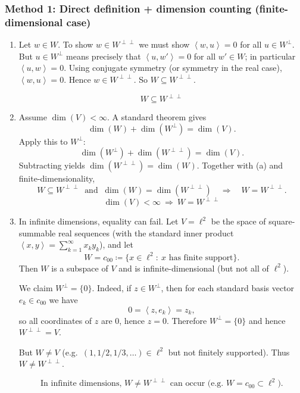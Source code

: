 \documentclass[12pt]{article}
\newcommand{\df}{\coloneqq}
\newcommand{\ip}[2]{\left\langle #1,#2\right\rangle}
\begin{document}
\subsubsection{Method 1: Direct definition + dimension counting (finite-dimensional case)}
\begin{enumerate}[label=(\alph*)]
\item Let $w\in W$. To show $w\in W^{\perp\perp}$ we must show $\ip{w}{u}=0$ for all $u\in W^\perp$.
But $u\in W^\perp$ means precisely that $\ip{u}{w'}=0$ for all $w'\in W$; in particular $\ip{u}{w}=0$.
Using conjugate symmetry (or symmetry in the real case), $\ip{w}{u}=0$. Hence $w\in W^{\perp\perp}$.
So $W\subseteq W^{\perp\perp}$.

\[
\boxed{\,W\subseteq W^{\perp\perp}\,}
\]

\item Assume $\dim(V)<\infty$. A standard theorem gives
\[
\dim(W)+\dim(W^\perp)=\dim(V).
\]
Apply this to $W^\perp$:
\[
\dim(W^\perp)+\dim(W^{\perp\perp})=\dim(V).
\]
Subtracting yields $\dim(W^{\perp\perp})=\dim(W)$. Together with (a) and finite-dimensionality,
\[
W\subseteq W^{\perp\perp}\ \text{ and }\ \dim(W)=\dim(W^{\perp\perp})
\quad\Longrightarrow\quad
W=W^{\perp\perp}.
\]
\[
\boxed{\,\dim(V)<\infty\ \Rightarrow\ W=W^{\perp\perp}\,}
\]

\item In infinite dimensions, equality can fail. Let $V=\ell^2$ be the space of square-summable real sequences
(with the standard inner product $\ip{x}{y}=\sum_{k=1}^\infty x_k y_k$), and let
\[
W=c_{00}\df \{x\in\ell^2:\ x\text{ has finite support}\}.
\]
Then $W$ is a subspace of $V$ and is infinite-dimensional (but not all of $\ell^2$).

We claim $W^\perp=\{0\}$. Indeed, if $z\in W^\perp$, then for each standard basis vector $e_k\in c_{00}$ we have
\[
0=\ip{z}{e_k}=z_k,
\]
so all coordinates of $z$ are $0$, hence $z=0$.
Therefore $W^\perp=\{0\}$ and hence $W^{\perp\perp}=V$.

But $W\neq V$ (e.g.\ $(1,1/2,1/3,\dots)\in \ell^2$ but not finitely supported).
Thus $W\neq W^{\perp\perp}$.

\[
\boxed{\,\text{In infinite dimensions, }W\neq W^{\perp\perp}\text{ can occur (e.g.\ }W=c_{00}\subset \ell^2).\,}
\]
\end{enumerate}
\end{document}
